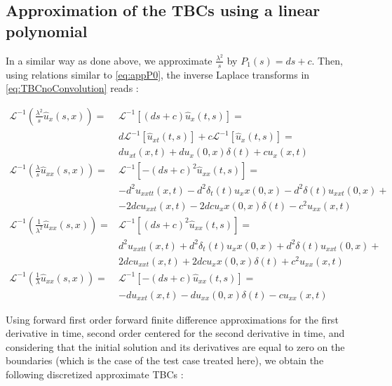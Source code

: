 \subsection{Approximation of the TBCs using a linear polynomial}

\indent In a similar way as done above, we approximate  $\frac{\lambda^2}{s}$ by $P_1(s) = ds + c$. Then, using relations similar to \eqref{eq:appP0}, the inverse Laplace transforms in \eqref{eq:TBCnoConvolution} reads :

\begin{equation*}
	\begin{aligned}
    \mathcal{L}^{-1} \left( \frac{\lambda^2}{s} \hat{u}_x(s,x) \right) = & \mathcal{L}^{-1} \left[ (ds+c) \hat{u}_x(t,s) \right] = \\
    			 & d\mathcal{L}^{-1} \left[ \hat{u}_{xt}(t,s) \right] + c \mathcal{L}^{-1} \left[ \hat{u}_{x}(t,s) \right] = \\
    			 &   du_{xt}(x,t) + du_x(0,x)\delta (t) + cu_x(x,t) \\
    \mathcal{L}^{-1} \left( \frac{\lambda}{s} \hat{u}_{xx}(s,x) \right) = & \mathcal{L}^{-1} \left[ -(ds+c)^2 \hat{u}_{xx}(t,s) \right] =\\
    			&  -d^2u_{xxtt}(x,t) - d^2\delta_t(t) u_xx(0,x) - d^2 \delta(t)u_{xxt}(0,x)  + \\ 
    			& - 2dcu_{xxt}(x,t) -  2dcu_xx(0,x)\delta (t) - c^2u_{xx}(x,t) \\
    \mathcal{L}^{-1} \left( \frac{1}{\lambda^2} \hat{u}_{xx}(s,x) \right) = & \mathcal{L}^{-1} \left[ (ds+c)^2 \hat{u}_{xx}(t,s) \right] = \\
    			& d^2u_{xxtt}(x,t) + d^2\delta_t(t) u_xx(0,x) + d^2 \delta(t)u_{xxt}(0,x)  + \\
    			& 2dcu_{xxt}(x,t) +  2dcu_xx(0,x)\delta (t) + c^2u_{xx}(x,t) \\
    \mathcal{L}^{-1} \left( \frac{1}{\lambda} \hat{u}_{xx}(s,x) \right) = & \mathcal{L}^{-1} \left[ -(ds+c) \hat{u}_{xx}(t,s) \right] = \\
    			& -du_{xxt}(x,t) - du_{xx}(0,x)\delta (t) - cu_{xx}(x,t)
\end{aligned}
\end{equation*}

\indent Using forward first order forward finite difference approximations for the first derivative in time, second order centered for the second derivative in time, and considering that the initial solution and its derivatives are equal to zero on the boundaries (which is the case of the test case treated here), we obtain the following discretized approximate TBCs : 

